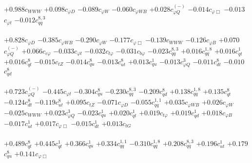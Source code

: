 \documentclass{article}
\begin{document}
{$+0.988$}{\rm $c_{WWW}$} 
{$+0.098$}{\rm $c_{\varphi D}$} 
{$-0.089$}{\rm $c_{\varphi W}$} 
{$-0.060$}{\rm $c_{\varphi WB}$} 
{$+0.028$}{\rm $c_{\varphi Q}^{(-)}$} 
{$-0.014$}{\rm $c_{\varphi \Box}$} 
{$-0.013$}{\rm $c_{\varphi t}$} 
{$-0.012$}{\rm $c_{qq}^{8,3}$} 
 \nonumber \\ \nonumber \\ 
{$+0.828$}{\rm $c_{\varphi D}$} 
{$-0.385$}{\rm $c_{\varphi WB}$} 
{$-0.290$}{\rm $c_{\varphi W}$} 
{$-0.177$}{\rm $c_{\varphi \Box}$} 
{$-0.139$}{\rm $c_{WWW}$} 
{$-0.126$}{\rm $c_{\varphi B}$} 
{$+0.070$}{\rm $c_{\varphi Q}^{(-)}$} 
{$+0.066$}{\rm $c_{c \varphi}$} 
{$-0.033$}{\rm $c_{\varphi t}$} 
{$-0.032$}{\rm $c_{t \varphi}$} 
{$-0.031$}{\rm $c_{b \varphi}$} 
{$-0.023$}{\rm $c_{qq}^{8,3}$} 
{$+0.016$}{\rm $c_{qq}^{1,8}$} 
{$+0.016$}{\rm $c_{qt}^{1}$} 
{$+0.016$}{\rm $c_{qt}^{8}$} 
{$-0.015$}{\rm $c_{tZ}$} 
{$-0.014$}{\rm $c_{qu}^{8}$} 
{$-0.013$}{\rm $c_{ut}^{8}$} 
{$+0.013$}{\rm $c_{qu}^{1}$} 
{$-0.013$}{\rm $c_{\varphi Q}^{3}$} 
{$-0.011$}{\rm $c_{dt}^{8}$} 
{$-0.010$}{\rm $c_{qd}^{8}$} 
 \nonumber \\ \nonumber \\ 
{$+0.723$}{\rm $c_{\varphi Q}^{(-)}$} 
{$-0.445$}{\rm $c_{\varphi t}$} 
{$-0.304$}{\rm $c_{qu}^{8}$} 
{$-0.230$}{\rm $c_{qq}^{8,3}$} 
{$-0.209$}{\rm $c_{qd}^{8}$} 
{$+0.138$}{\rm $c_{qq}^{1,8}$} 
{$+0.135$}{\rm $c_{qt}^{8}$} 
{$-0.124$}{\rm $c_{dt}^{8}$} 
{$-0.119$}{\rm $c_{ut}^{8}$} 
{$+0.095$}{\rm $c_{tZ}$} 
{$-0.071$}{\rm $c_{\varphi D}$} 
{$-0.055$}{\rm $c_{qq}^{1,1}$} 
{$+0.035$}{\rm $c_{\varphi WB}$} 
{$+0.026$}{\rm $c_{\varphi W}$} 
{$-0.025$}{\rm $c_{WWW}$} 
{$+0.023$}{\rm $c_{\varphi Q}^{3}$} 
{$-0.023$}{\rm $c_{qu}^{1}$} 
{$+0.020$}{\rm $c_{qt}^{1}$} 
{$+0.019$}{\rm $c_{t \varphi}$} 
{$+0.019$}{\rm $c_{qd}^{1}$} 
{$+0.018$}{\rm $c_{\varphi B}$} 
{$-0.017$}{\rm $c_{ut}^{1}$} 
{$+0.017$}{\rm $c_{\varphi \Box}$} 
{$-0.015$}{\rm $c_{dt}^{1}$} 
{$+0.013$}{\rm $c_{tG}$} 
 \nonumber \\ \nonumber \\ 
{$+0.489$}{\rm $c_{qt}^{8}$} 
{$+0.445$}{\rm $c_{qt}^{1}$} 
{$+0.366$}{\rm $c_{qu}^{1}$} 
{$+0.334$}{\rm $c_{qq}^{1,1}$} 
{$-0.310$}{\rm $c_{qq}^{1,8}$} 
{$+0.208$}{\rm $c_{qq}^{8,3}$} 
{$+0.196$}{\rm $c_{ut}^{1}$} 
{$+0.179$}{\rm $c_{qu}^{8}$} 
{$+0.141$}{\rm $c_{\varphi \Box}$} 
\end{document}
